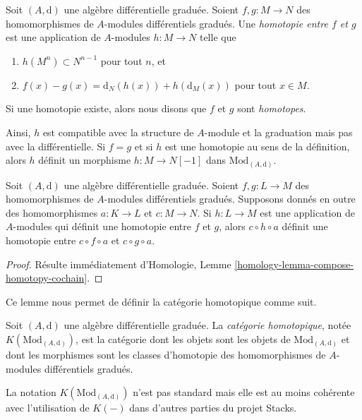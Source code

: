 \begin{definition}
\label{definition-homotopy}
Soit $(A, \text{d})$ une algèbre différentielle graduée. Soient $f, g : M \to N$ des
homomorphismes de $A$-modules différentiels gradués. Une {\it homotopie entre $f$
et $g$} est une application de $A$-modules $h : M \to N$ telle que
\begin{enumerate}
\item $h(M^n) \subset N^{n - 1}$ pour tout $n$, et
\item $f(x) - g(x) = \text{d}_N(h(x)) + h(\text{d}_M(x))$ pour tout $x \in M$.
\end{enumerate}
Si une homotopie existe, alors nous disons que $f$ et $g$ sont {\it homotopes}.
\end{definition}

\noindent
Ainsi, $h$ est compatible avec la structure de $A$-module et la graduation mais
pas avec la différentielle. Si $f = g$ et si $h$ est une homotopie au sens de la
définition, alors $h$ définit un morphisme $h : M \to N[-1]$ dans $\text{Mod}_{(A,
\text{d})}$.

\begin{lemma}
\label{lemma-compose-homotopy}
Soit $(A, \text{d})$ une algèbre différentielle graduée. Soient $f, g : L \to M$
des homomorphismes de $A$-modules différentiels gradués. Supposons donnés en outre
des homomorphismes $a : K \to L$ et $c : M \to N$. Si $h : L \to M$ est une
application de $A$-modules qui définit une homotopie entre $f$ et $g$, alors $c \circ
h \circ a$ définit une homotopie entre $c \circ f \circ a$ et $c \circ g \circ a$.
\end{lemma}

\begin{proof}
Résulte immédiatement d'Homologie, Lemme
\ref{homology-lemma-compose-homotopy-cochain}.
\end{proof}

\noindent
Ce lemme nous permet de définir la catégorie homotopique comme suit.

\begin{definition}
\label{definition-complexes-notation}
Soit $(A, \text{d})$ une algèbre différentielle graduée. La {\it catégorie homotopique},
notée $K(\text{Mod}_{(A, \text{d})})$, est la catégorie dont les objets sont
les objets de $\text{Mod}_{(A, \text{d})}$ et dont les morphismes sont les classes
d'homotopie des homomorphismes de $A$-modules différentiels gradués.
\end{definition}

\noindent
La notation $K(\text{Mod}_{(A, \text{d})})$ n'est pas standard mais elle est au
moins cohérente avec l'utilisation de $K(-)$ dans d'autres parties du projet
Stacks.

